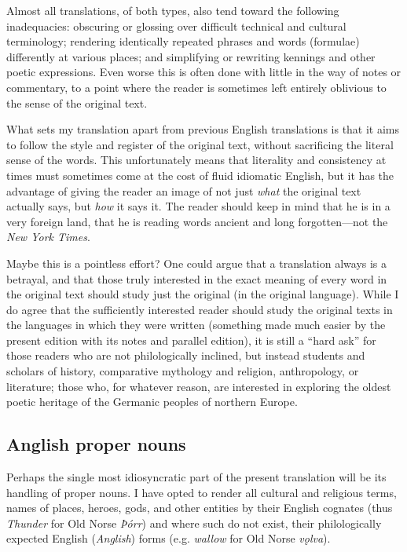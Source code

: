     Almost all translations, of both types, also tend toward the following inadequacies: obscuring or glossing over difficult technical and cultural terminology; rendering identically repeated phrases and words (formulae) differently at various places; and simplifying or rewriting kennings and other poetic expressions.  Even worse this is often done with little in the way of notes or commentary, to a point where the reader is sometimes left entirely oblivious to the sense of the original text.

    What sets my translation apart from previous English translations is that it aims to follow the style and register of the original text, without sacrificing the literal sense of the words.  This unfortunately means that literality and consistency at times must sometimes come at the cost of fluid idiomatic English, but it has the advantage of giving the reader an image of not just \emph{what} the original text actually says, but \emph{how} it says it.  The reader should keep in mind that he is in a very foreign land, that he is reading words ancient and long forgotten—not the \emph{New York Times}.

    Maybe this is a pointless effort? One could argue that a translation always is a betrayal, and that those truly interested in the exact meaning of every word in the original text should study just the original (in the original language).  While I do agree that the sufficiently interested reader should study the original texts in the languages in which they were written (something made much easier by the present edition with its notes and parallel edition), it is still a “hard ask” for those readers who are not philologically inclined, but instead students and scholars of history, comparative mythology and religion, anthropology, or literature; those who, for whatever reason, are interested in exploring the oldest poetic heritage of the Germanic peoples of northern Europe.

    \subsection{Anglish proper nouns}
      Perhaps the single most idiosyncratic part of the present translation will be its handling of proper nouns. I have opted to render all cultural and religious terms, names of places, heroes, gods, and other entities by their English cognates (thus \emph{Thunder} for Old Norse \emph{Þórr}) and where such do not exist, their philologically expected English (\emph{Anglish}) forms (e.g. \emph{wallow} for Old Norse \emph{vǫlva}).

